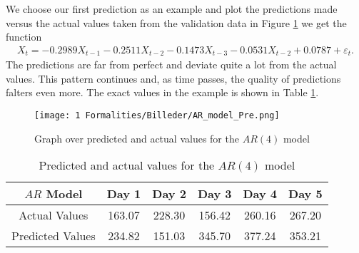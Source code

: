 \noindent We choose our first prediction as an example and plot the predictions made versus the actual values taken from the validation data in Figure \ref{fig:AR_model_with_predictions} we get the function
\begin{align*}
    X_t=-0.2989X_{t-1}-0.2511X_{t-2}-0.1473X_{t-3}-0.0531X_{t-2}+0.0787+\varepsilon_t.
\end{align*}
The predictions are far from perfect and deviate quite a lot from the actual values. This pattern continues and, as time passes, the quality of predictions falters even more. The exact values in the example is shown in Table \ref{tab:AR_two_rows}.
\begin{figure}[H]
    \centering
    \texttt{[image: 1 Formalities/Billeder/AR\_model\_Pre.png]}
    \caption{Graph over predicted and actual values for the $AR(4)$ model}
    \label{fig:AR_model_with_predictions}
\end{figure}

\begin{table}[H]
  \centering  \begin{tabular}{|c|c|c|c|c|c|}
    \hline
   $AR$ Model & Day 1 & Day 2 & Day 3 & Day 4 & Day 5 \\
    \hline
    Actual Values & 163.07 & 228.30 & 156.42 & 260.16 & 267.20 \\
    \hline
    Predicted Values &  234.82& 151.03& 345.70& 377.24& 353.21\\
    \hline

  \end{tabular}
  \caption{Predicted and actual values for the $AR(4)$ model}
  \label{tab:AR_two_rows}
\end{table}

